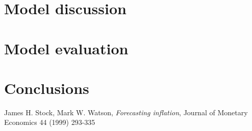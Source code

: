 \documentclass[paper=letter, fontsize=13pt]{article}
\begin{document}
\section{Model discussion}


\section{Model evaluation}



\section{Conclusions}




\begin{thebibliography}{99}
James H. Stock, Mark  W. Watson, \textit{Forecasting inflation}, Journal of Monetary Economics 44 (1999) 293-335

\end{thebibliography}


\end{document}
